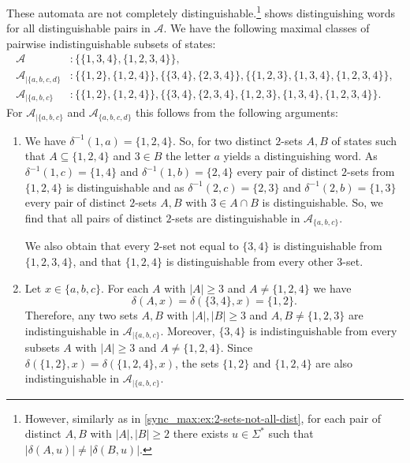 \begin{example}
	These automata are not completely distinguishable.\footnote{However, similarly
		as in \cref{sync_max:ex:2-sets-not-all-dist}, for each pair of distinct $A,B$ with $|A|,|B| \ge 2$
		there exists $u \in \Sigma^*$ such that $|\delta(A, u)| \ne |\delta(B, u)|$.}
	shows distinguishing words for all distinguishable pairs in $\mathcal A$.	
	We have the
	following maximal classes of pairwise indistinguishable
	subsets of states:
	\begin{align*}
		\mathcal A                & : \{\{1,3,4\}, \{1,2,3,4\}\}, \\ 
		\mathcal A_{|\{a,b,c,d\}} & : \{\{1,2\},\{1,2,4\}\}, \{ \{3,4\}, \{2,3,4\}\}, \{ \{1,2,3\}, \{1,3,4\}, \{1,2,3,4\}\}, \\
		\mathcal A_{|\{a,b,c\}}   & : \{\{1,2\},\{1,2,4\}\}, \{ \{3,4\},  \{2,3,4\}, \{1,2,3\}, \{1,3,4\}, \{1,2,3,4\}\}.  	
	\end{align*}
 	For $\mathcal A_{|\{a,b,c\}}$ and $\mathcal A_{\{a,b,c,d\}}$ this follows from the following arguments:
	\begin{enumerate} 
	\item \label{sync_max:ex:2-sets-but-not-all-new:1} We have  $\delta^{-1}(1, a) = \{1,2,4\}$.
	So, for two distinct $2$-sets $A, B$ of states
	such that $A \subseteq \{1,2,4\}$ and $3 \in B$
	the letter $a$ yields a distinguishing word.
	As $\delta^{-1}(1, c) = \{1,4\}$
	and $\delta^{-1}(1, b) = \{2,4\}$
	every pair of distinct $2$-sets from $\{1,2,4\}$
	is distinguishable
	and as $\delta^{-1}(2,c) = \{2,3\}$
	and $\delta^{-1}(2, b) = \{1,3\}$
	every pair of distinct $2$-sets $A, B$ with $3 \in A \cap B$
	is distinguishable.
	So, we find that all pairs of distinct $2$-sets
	are distinguishable in $\mathcal A_{\{a,b,c\}}$.
	
	We also obtain that every $2$-set not equal to $\{3,4\}$
	is distinguishable from $\{1,2,3,4\}$, and that $\{1,2,4\}$
	is distinguishable from every other $3$-set.
		
	\item \label{sync_max:ex:2-sets-but-not-all-new:2} Let $x \in \{a,b,c\}$. For each $A$ with $|A| \ge 3$ and $A \ne \{1,2,4\}$ 
	we have 
	\[ 
	\delta(A, x) = \delta(\{3,4\}, x) = \{1,2\}.
	\]
	Therefore, any two sets $A,B$ with $|A|,|B|\ge 3$ and $A,B \ne \{1,2,3\}$
	are indistinguishable in $\mathcal A_{|\{a,b,c\}}$.
	Moreover, $\{3,4\}$ is indistinguishable
	from every subsets $A$ with $|A| \ge 3$ and $A \ne \{1,2,4\}$.
	Since $\delta(\{1,2\}, x) = \delta(\{1,2,4\}, x)$,
	the sets $\{1,2\}$ and $\{1,2,4\}$ are also indistinguishable in $\mathcal A_{|\{a,b,c\}}$.
	

\end{enumerate}
\end{example}
